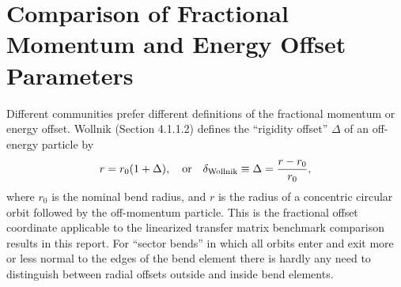 \documentclass[]{article}
\begin{document}
%



\section{Comparison of Fractional Momentum and Energy Offset Parameters}
Different communities prefer different definitions of the fractional
momentum or energy offset.  Wollnik (Section 4.1.1.2) defines the 
``rigidity offset'' $\Delta$ of an off-energy particle by  
%
\begin{equation}
r = r_0(1 + \Delta),
\quad\hbox{or}\quad
\delta_{\rm Wollnik} \equiv \Delta = \frac{r - r_0}{r_0},
\label{eq:Offset.1}
\end{equation}
%
where $r_0$ is the nominal bend radius, and $r$ is the radius of
a concentric circular orbit followed by the off-momentum particle.
This is the fractional offset coordinate applicable to the linearized transfer 
matrix benchmark comparison results in this report.  For ``sector bends'' in 
which all orbits enter and exit more or less normal to the edges of the
bend element there is hardly any need to distinguish between radial
offsets outside and inside bend elements.
\end{document}
